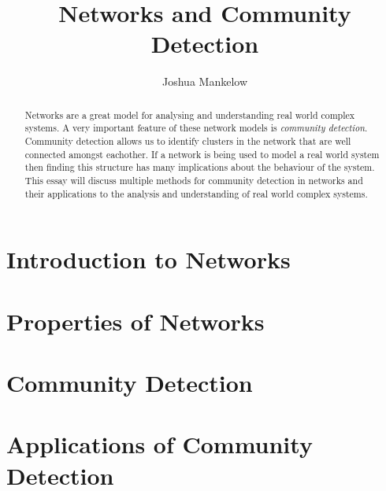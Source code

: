 \documentclass[a4paper]{article}
\title{Networks and Community Detection}
\author{Joshua Mankelow}
\begin{document}
\maketitle

\begin{abstract}
    Networks are a great model for analysing and understanding real world complex systems. A very important feature of these network models is \emph{community detection}. Community detection allows us to identify clusters in the network that are well connected amongst eachother. If a network is being used to model a real world system then finding this structure has many implications about the behaviour of the system. This essay will discuss multiple methods for community detection in networks and their applications to the analysis and understanding of real world complex systems. \\
\end{abstract}

\newpage

\tableofcontents
\listoftodos
{}

\newpage

\section{Introduction to Networks}\label{sec:Introduction to Networks}

\newpage

\section{Properties of Networks}\label{sec:Properties of Networks}

\newpage

\section{Community Detection}\label{sec:Community Detection}

\newpage

\section{Applications of Community Detection}\label{sec:Appliations of Community Detection}

\newpage



\end{document}

